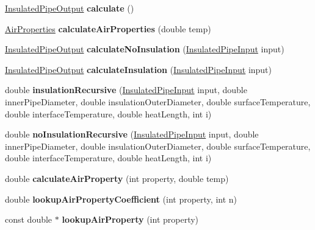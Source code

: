 \begin{DoxyCompactItemize}
\hyperlink{class_insulated_pipe_output}{Insulated\+Pipe\+Output} {\bfseries calculate} ()
\item 
\mbox{\label{class_insulated_pipe_calculator_ac23f5e548594269d1548f9959906c988}} 
\hyperlink{class_air_properties}{Air\+Properties} {\bfseries calculate\+Air\+Properties} (double temp)
\item 
\mbox{\label{class_insulated_pipe_calculator_a47aba38ca8bcf6c4e873fdda75e7c982}} 
\hyperlink{class_insulated_pipe_output}{Insulated\+Pipe\+Output} {\bfseries calculate\+No\+Insulation} (\hyperlink{class_insulated_pipe_input}{Insulated\+Pipe\+Input} input)
\item 
\mbox{\label{class_insulated_pipe_calculator_a6cca6d6e69ee7c30dd68123678412652}} 
\hyperlink{class_insulated_pipe_output}{Insulated\+Pipe\+Output} {\bfseries calculate\+Insulation} (\hyperlink{class_insulated_pipe_input}{Insulated\+Pipe\+Input} input)
\item 
\mbox{\label{class_insulated_pipe_calculator_a56eff4f9840a7c9dfc49c3ad99183660}} 
double {\bfseries insulation\+Recursive} (\hyperlink{class_insulated_pipe_input}{Insulated\+Pipe\+Input} input, double inner\+Pipe\+Diameter, double insulation\+Outer\+Diameter, double surface\+Temperature, double interface\+Temperature, double heat\+Length, int i)
\item 
\mbox{\label{class_insulated_pipe_calculator_a9659b458041d78e7ae8cd6521b7ffb32}} 
double {\bfseries no\+Insulation\+Recursive} (\hyperlink{class_insulated_pipe_input}{Insulated\+Pipe\+Input} input, double inner\+Pipe\+Diameter, double insulation\+Outer\+Diameter, double surface\+Temperature, double interface\+Temperature, double heat\+Length, int i)
\item 
\mbox{\label{class_insulated_pipe_calculator_a411f18d08cfd339784cbafde971c875a}} 
double {\bfseries calculate\+Air\+Property} (int property, double temp)
\item 
\mbox{\label{class_insulated_pipe_calculator_ad53128ebc9650dcf15e1ca64820cfa1b}} 
double {\bfseries lookup\+Air\+Property\+Coefficient} (int property, int n)
\item 
\mbox{\label{class_insulated_pipe_calculator_af645925534076df7861aa95b73b09902}} 
const double $\ast$ {\bfseries lookup\+Air\+Property} (int property)
\end{DoxyCompactItemize}


